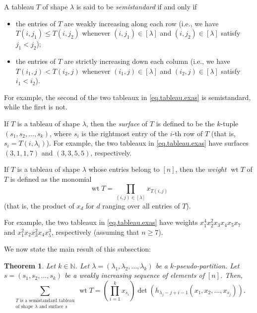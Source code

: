 \documentclass[reqno]{amsart}%
\newcommand{\0}{\phantom{c}}
\let\sumnonlimits\sum
\let\prodnonlimits\prod
\renewcommand{\sum}{\sumnonlimits\limits}
\renewcommand{\prod}{\prodnonlimits\limits}
\newcommand{\defn}[1]{{\color{darkred}\emph{#1}}}
\theoremstyle{plain}
\newtheorem{thm}{Theorem}[section]
\theoremstyle{definition}
\numberwithin{equation}{section}
\begin{document}
A tableau $T$ of shape $\lambda$ is said to be \defn{semistandard} if and only if

\begin{itemize}
\item the entries of $T$ are weakly increasing along each row (i.e., we have
$T\left(  i,j_{1}\right)  \leq T\left(  i,j_{2}\right)  $ whenever $\left(
i,j_{1}\right)  \in\left[  \lambda\right]  $ and $\left(  i,j_{2}\right)
\in\left[  \lambda\right]  $ satisfy $j_{1}<j_{2}$);

\item the entries of $T$ are strictly increasing down each column (i.e., we
have $T\left(  i_{1},j\right)  <T\left(  i_{2},j\right)  $ whenever $\left(
i_{1},j\right)  \in\left[  \lambda\right]  $ and $\left(  i_{2},j\right)
\in\left[  \lambda\right]  $ satisfy $i_{1}<i_{2}$).
\end{itemize}

For example, the second of the two tableaux in \eqref{eq.tableau.exas} is
semistandard, while the first is not.

If $T$ is a tableau of shape $\lambda$, then the \defn{surface} of $T$ is
defined to be the $k$-tuple $\left(  s_{1},s_{2},\ldots,s_{k}\right)  $, where
$s_{i}$ is the rightmost entry of the $i$-th row of $T$ (that is,
$s_{i}=T\left(  i,\lambda_{i}\right)  $). For example, the two tableaux in
\eqref{eq.tableau.exas} have surfaces $\left(  3,1,1,7\right)  $ and $\left(
3,3,5,5\right)  $, respectively.

If $T$ is a tableau of shape $\lambda$ whose entries belong to $\left[
n\right]  $, then the \defn{weight $\operatorname{wt} T$} of $T$ is defined as
the monomial%
\[
\operatorname*{wt}T=\prod_{\left(  i,j\right)  \in\left[  \lambda\right]
}x_{T\left(  i,j\right)  }%
\]
(that is, the product of $x_{d}$ for $d$ ranging over all entries of $T$).

For example, the two tableaux in \eqref{eq.tableau.exas} have weights
$x_{1}^{4}x_{2}^{2}x_{3}x_{4}x_{5}x_{7}$ and $x_{1}^{2}x_{2}x_{3}^{2}%
x_{4}x_{5}^{3}$, respectively (assuming that $n\geq7$).

We now state the main result of this subsection:

\begin{thm}
\label{thm.tableau.jt}Let $k\in\mathbb{N}$. Let $\lambda=\left(  \lambda
_{1},\lambda_{2},\ldots,\lambda_{k}\right)  $ be a $k$-pseudo-partition. Let
$s=\left(  s_{1},s_{2},\ldots,s_{k}\right)  $ be a weakly increasing sequence
of elements of $\left[  n\right]  $. Then,%
\[
\sum_{\substack{T\text{ is a semistandard tableau}\\\text{of shape }%
\lambda\text{ and surface }s}}\operatorname*{wt}T=\left(  \prod_{i=1}%
^{k}x_{s_{i}}\right)  \det\left(  h_{\lambda_{j}-j+i-1}\left(  x_{1}%
,x_{2},\ldots,x_{s_{j}}\right)  \right)  .
\]

\end{thm}
\end{document}
